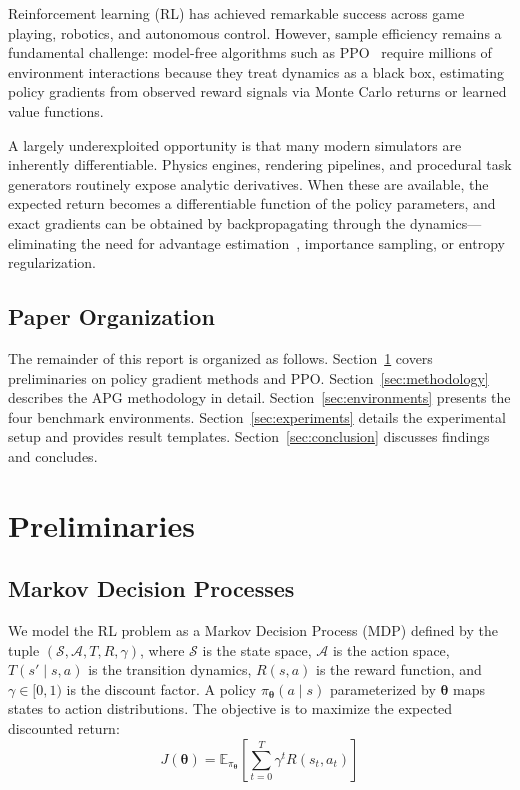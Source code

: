 \documentclass[11pt,a4paper]{article}
\newcommand{\E}{\mathbb{E}}
\newcommand{\cA}{\mathcal{A}}
\newcommand{\cS}{\mathcal{S}}
\newcommand{\btheta}{\bm{\theta}}
\begin{document}
Reinforcement learning (RL) has achieved remarkable success across game playing, robotics, and autonomous control. However, sample efficiency remains a fundamental challenge: model-free algorithms such as PPO~\cite{schulman2017ppo} require millions of environment interactions because they treat dynamics as a black box, estimating policy gradients from observed reward signals via Monte Carlo returns or learned value functions.

A largely underexploited opportunity is that many modern simulators are inherently differentiable. Physics engines, rendering pipelines, and procedural task generators routinely expose analytic derivatives. When these are available, the expected return becomes a differentiable function of the policy parameters, and exact gradients can be obtained by backpropagating through the dynamics—eliminating the need for advantage estimation~\cite{schulman2016gae}, importance sampling, or entropy regularization.

\subsection{Paper Organization}
\label{sec:organization}

The remainder of this report is organized as follows. Section~\ref{sec:preliminaries} covers preliminaries on policy gradient methods and PPO. Section~\ref{sec:methodology} describes the APG methodology in detail. Section~\ref{sec:environments} presents the four benchmark environments. Section~\ref{sec:experiments} details the experimental setup and provides result templates. Section~\ref{sec:conclusion} discusses findings and concludes.

\section{Preliminaries}
\label{sec:preliminaries}

\subsection{Markov Decision Processes}
\label{sec:mdp}

We model the RL problem as a Markov Decision Process (MDP) defined by the tuple $(\cS, \cA, T, R, \gamma)$, where $\cS$ is the state space, $\cA$ is the action space, $T(s' \mid s, a)$ is the transition dynamics, $R(s, a)$ is the reward function, and $\gamma \in [0, 1)$ is the discount factor. A policy $\pi_{\btheta}(a \mid s)$ parameterized by $\btheta$ maps states to action distributions. The objective is to maximize the expected discounted return:
\begin{equation}
  J(\btheta) = \E_{\pi_{\btheta}}\left[\sum_{t=0}^{T} \gamma^t R(s_t, a_t)\right]
  \label{eq:objective}
\end{equation}
\end{document}
